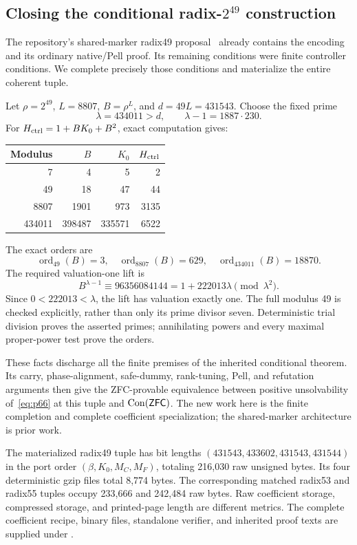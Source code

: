 \subsection{Closing the conditional radix-$2^{49}$ construction}

The repository's shared-marker radix49 proposal~\cite{radix49} already
contains the encoding and its ordinary native/Pell proof. Its remaining
conditions were finite controller conditions. We complete precisely
those conditions and materialize the entire coherent tuple.

Let $\rho=2^{49}$, $L=8807$, $B=\rho^L$, and $d=49L=431543$.
Choose the fixed prime
\[
 \lambda=434011>d,\qquad \lambda-1=1887\cdot230.
\]
For $H_{\rm ctrl}=1+BK_0+B^2$, exact computation gives:
\begin{center}
\begin{tabular}{@{}rrrr@{}}
\toprule
Modulus & $B$ & $K_0$ & $H_{\rm ctrl}$\\
\midrule
7 & 4 & 5 & 2\\
49 & 18 & 47 & 44\\
8807 & 1901 & 973 & 3135\\
434011 & 398487 & 335571 & 6522\\
\bottomrule
\end{tabular}
\end{center}
The exact orders are
\[
 \operatorname{ord}_{49}(B)=3,\quad
 \operatorname{ord}_{8807}(B)=629,\quad
 \operatorname{ord}_{434011}(B)=18870.
\]
The required valuation-one lift is
\[
 B^{\lambda-1}\equiv96356084144
 =1+222013\lambda\pmod{\lambda^2}.
\]
Since $0<222013<\lambda$, the lift has valuation exactly one.
The full modulus 49 is checked explicitly, rather than only its prime
divisor seven. Deterministic trial division proves the asserted primes;
annihilating powers and every maximal proper-power test prove the orders.

These facts discharge all the finite premises of the inherited
conditional theorem. Its carry, phase-alignment, safe-dummy, rank-tuning,
Pell, and refutation arguments then give the ZFC-provable equivalence
between positive unsolvability of~\eqref{eq:p66} at this tuple and
$\operatorname{Con}(\mathsf{ZFC})$. The new work here is the finite completion and complete
coefficient specialization; the shared-marker architecture is prior work.

The materialized radix49 tuple has bit lengths
$(431543,433602,431543,431544)$ in the port order
$(\beta,K_0,M_C,M_F)$, totaling 216,030 raw unsigned bytes. Its four
deterministic gzip files total 8,774 bytes. The corresponding matched
radix53 and radix55 tuples occupy 233,666 and 242,484 raw bytes.
Raw coefficient storage, compressed storage, and printed-page length
are different metrics. The complete coefficient recipe, binary files,
standalone verifier, and inherited proof texts are supplied under
.


